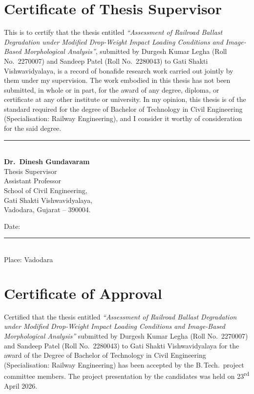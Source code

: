 \chapter*{Certificate of Thesis Supervisor}
\thispagestyle{plain}

This is to certify that the thesis entitled
\textit{``Assessment of Railroad Ballast Degradation under Modified
Drop-Weight Impact Loading Conditions and Image-Based Morphological
Analysis''}, submitted by Durgesh Kumar Legha (Roll No.\ 2270007) and
Sandeep Patel (Roll No.\ 2280043) to Gati Shakti Vishwavidyalaya, is a record
of bonafide research work carried out jointly by them under my supervision.
The work embodied in this thesis has not been submitted, in whole or in part,
for the award of any degree, diploma, or certificate at any other institute
or university. In my opinion, this thesis is of the standard required for the
degree of Bachelor of Technology in Civil Engineering (Specialisation:
Railway Engineering), and I consider it worthy of consideration for the said
degree.

\vspace{2.0cm}
\noindent\rule{7cm}{0.4pt}\\[2pt]
\textbf{Dr.\ Dinesh Gundavaram}\\
Thesis Supervisor\\
Assistant Professor\\
School of Civil Engineering,\\
Gati Shakti Vishwavidyalaya,\\
Vadodara, Gujarat -- 390004.

\vspace{1.0cm}
\noindent Date: \rule{4cm}{0.4pt}\\
Place: Vadodara

\chapter*{Certificate of Approval}
\thispagestyle{plain}

Certified that the thesis entitled
\textit{``Assessment of Railroad Ballast Degradation under Modified
Drop-Weight Impact Loading Conditions and Image-Based Morphological
Analysis''} submitted by Durgesh Kumar Legha (Roll No.\ 2270007) and
Sandeep Patel (Roll No.\ 2280043) to Gati Shakti Vishwavidyalaya for the
award of the Degree of Bachelor of Technology in Civil Engineering
(Specialisation: Railway Engineering) has been accepted by the B.\,Tech.\
project committee members. The project presentation by the candidates was
held on 23\textsuperscript{rd} April 2026.

